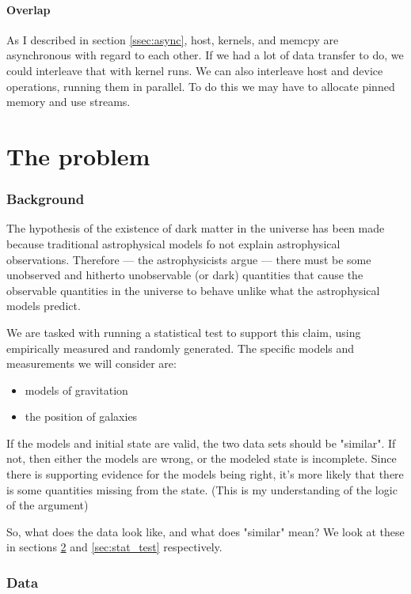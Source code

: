 \documentclass[a4paper,titlepage,12pt]{article}
\begin{document}
\begin{description}[left = \parindent]
\subsection{Overlap}

As I described in section \ref{ssec:async}, host, kernels, and memcpy are asynchronous with regard to each other.
If we had a lot of data transfer to do, we could interleave that with kernel runs.
We can also interleave host and device operations, running them in parallel.
To do this we may have to allocate pinned memory and use streams.

\clearpage
\part{The problem}

\section{Background}

The hypothesis of the existence of dark matter in the universe has been made because traditional astrophysical models fo not explain astrophysical observations.
Therefore --- the astrophysicists argue --- there must be some unobserved and hitherto unobservable (or dark) quantities that cause the observable quantities in the universe to behave unlike what the astrophysical models predict.

We are tasked with running a statistical test to support this claim, using empirically measured and randomly generated.
The specific models and measurements we will consider are:

\begin{itemize}
	\item models of gravitation
	\item the position of galaxies
\end{itemize}

If the models and initial state are valid, the two data sets should be "similar".
If not, then either the models are wrong, or the modeled state is incomplete.
Since there is supporting evidence for the models being right, it's more likely that there is some quantities missing from the state. (This is my understanding of the logic of the argument)

So, what does the data look like, and what does "similar" mean?
We look at these in sections \ref{sec:data} and \ref{sec:stat_test} respectively.

\section{Data}
\label{sec:data}


\end{description}
\end{document}

